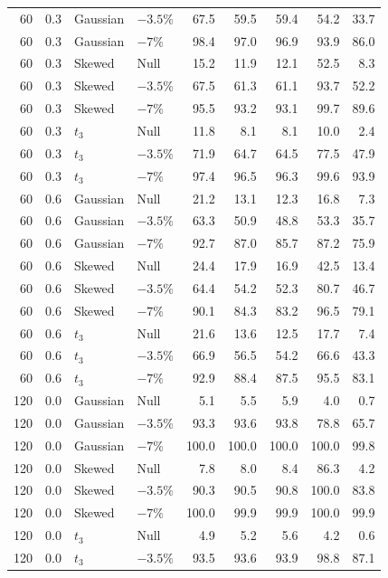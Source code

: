 \begin{longtable}{rrllrrrrr}
60 & 0.3 & Gaussian & $-3.5\%$ & 67.5 & 59.5 & 59.4 & 54.2 & 33.7 \\
60 & 0.3 & Gaussian & $-7\%$ & 98.4 & 97.0 & 96.9 & 93.9 & 86.0 \\
60 & 0.3 & Skewed & Null & 15.2 & 11.9 & 12.1 & 52.5 & 8.3 \\
60 & 0.3 & Skewed & $-3.5\%$ & 67.5 & 61.3 & 61.1 & 93.7 & 52.2 \\
60 & 0.3 & Skewed & $-7\%$ & 95.5 & 93.2 & 93.1 & 99.7 & 89.6 \\
60 & 0.3 & $t_3$ & Null & 11.8 & 8.1 & 8.1 & 10.0 & 2.4 \\
60 & 0.3 & $t_3$ & $-3.5\%$ & 71.9 & 64.7 & 64.5 & 77.5 & 47.9 \\
60 & 0.3 & $t_3$ & $-7\%$ & 97.4 & 96.5 & 96.3 & 99.6 & 93.9 \\
60 & 0.6 & Gaussian & Null & 21.2 & 13.1 & 12.3 & 16.8 & 7.3 \\
60 & 0.6 & Gaussian & $-3.5\%$ & 63.3 & 50.9 & 48.8 & 53.3 & 35.7 \\
60 & 0.6 & Gaussian & $-7\%$ & 92.7 & 87.0 & 85.7 & 87.2 & 75.9 \\
60 & 0.6 & Skewed & Null & 24.4 & 17.9 & 16.9 & 42.5 & 13.4 \\
60 & 0.6 & Skewed & $-3.5\%$ & 64.4 & 54.2 & 52.3 & 80.7 & 46.7 \\
60 & 0.6 & Skewed & $-7\%$ & 90.1 & 84.3 & 83.2 & 96.5 & 79.1 \\
60 & 0.6 & $t_3$ & Null & 21.6 & 13.6 & 12.5 & 17.7 & 7.4 \\
60 & 0.6 & $t_3$ & $-3.5\%$ & 66.9 & 56.5 & 54.2 & 66.6 & 43.3 \\
60 & 0.6 & $t_3$ & $-7\%$ & 92.9 & 88.4 & 87.5 & 95.5 & 83.1 \\
120 & 0.0 & Gaussian & Null & 5.1 & 5.5 & 5.9 & 4.0 & 0.7 \\
120 & 0.0 & Gaussian & $-3.5\%$ & 93.3 & 93.6 & 93.8 & 78.8 & 65.7 \\
120 & 0.0 & Gaussian & $-7\%$ & 100.0 & 100.0 & 100.0 & 100.0 & 99.8 \\
120 & 0.0 & Skewed & Null & 7.8 & 8.0 & 8.4 & 86.3 & 4.2 \\
120 & 0.0 & Skewed & $-3.5\%$ & 90.3 & 90.5 & 90.8 & 100.0 & 83.8 \\
120 & 0.0 & Skewed & $-7\%$ & 100.0 & 99.9 & 99.9 & 100.0 & 99.9 \\
120 & 0.0 & $t_3$ & Null & 4.9 & 5.2 & 5.6 & 4.2 & 0.6 \\
120 & 0.0 & $t_3$ & $-3.5\%$ & 93.5 & 93.6 & 93.9 & 98.8 & 87.1 \\

\end{longtable}
